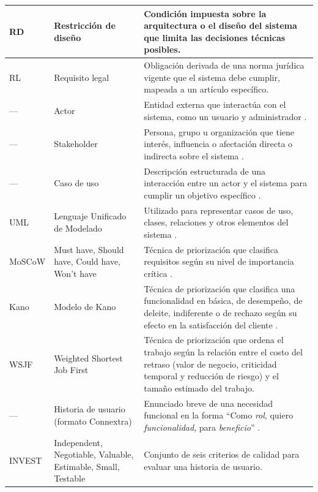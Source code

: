 \documentclass[journal,onecolumn]{IEEEtran}
\begin{document}
\begin{longtable}{|p{2.2cm}|p{3.3cm}|p{9.5cm}|}
		RD & Restricción de diseño & Condición impuesta sobre la arquitectura o el diseño del sistema que limita las decisiones técnicas posibles. \\ \hline
		
		RL & Requisito legal & Obligación derivada de una norma jurídica vigente que el sistema debe cumplir, mapeada a un artículo específico. \\ \hline
		
		--- & Actor & Entidad externa que interactúa con el sistema, como un usuario y administrador \cite{blasco2020, vranic2023}. \\ \hline
		
		--- & Stakeholder & Persona, grupo u organización que tiene interés, influencia o afectación directa o indirecta sobre el sistema \cite{khan2022}. \\ \hline
		
		--- & Caso de uso & Descripción estructurada de una interacción entre un actor y el sistema para cumplir un objetivo específico \cite{vranic2023}. \\ \hline
		
		UML & Lenguaje Unificado de Modelado & Utilizado para representar casos de uso, clases, relaciones y otros elementos del sistema \cite{narulita2024}. \\ \hline
		
		MoSCoW & Must have, Should have, Could have, Won't have & Técnica de priorización que clasifica requisitos según su nivel de importancia crítica \cite{vijayakumar2024}. \\ \hline
		
		Kano & Modelo de Kano & Técnica de priorización que clasifica una funcionalidad en básica, de desempeño, de deleite, indiferente o de rechazo según su efecto en la satisfacción del cliente \cite{kano1984}. \\ \hline
		
		WSJF & Weighted Shortest Job First & Técnica de priorización que ordena el trabajo según la relación entre el costo del retraso (valor de negocio, criticidad temporal y reducción de riesgo) y el tamaño estimado del trabajo. \\ \hline
		
		--- & Historia de usuario (formato Connextra) & Enunciado breve de una necesidad funcional en la forma \enquote{Como \emph{rol}, quiero \emph{funcionalidad}, para \emph{beneficio}} \cite{cohn2004}. \\ \hline
		
		INVEST & Independent, Negotiable, Valuable, Estimable, Small, Testable & Conjunto de seis criterios de calidad para evaluar una historia de usuario. \\ \hline
		

\end{longtable}
\end{document}
